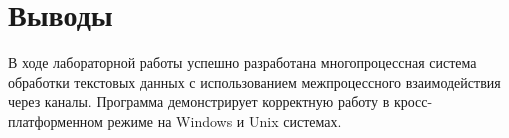 \section{Выводы}

В ходе лабораторной работы успешно разработана многопроцессная система обработки текстовых данных с использованием межпроцессного взаимодействия через каналы. Программа демонстрирует корректную работу в кросс-платформенном режиме на Windows и Unix системах.

\pagebreak